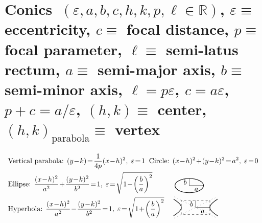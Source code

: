 \section*{Conics\ \normalfont\scriptsize{$(\varepsilon,a,b,c,h,k,p,\ell\in\mathbb{R})$, $\varepsilon\equiv$ eccentricity, $c\equiv$ focal distance, $p \equiv$ focal parameter, $\ell \equiv$ semi-latus rectum, $a\equiv$ semi-major axis, $b \equiv$ semi-minor axis, $\ell = p \varepsilon$, $c=a\varepsilon$}, $p+c =a/\varepsilon $, $(h,k)\equiv$ center, $(h,k)_{\text{parabola}}\equiv$ vertex }
\begin{align*}
&\text{Vertical parabola: }(y\!-\!k)\!=\!\frac{1}{4p}(x\!-\!h)^2,\;\varepsilon\!=\!1 \;\;\text{Circle: }(x\!-\!h)^2\!+\!(y\!-\!k)^2\!=\!a^2,\;\varepsilon\!=\!0 \\
&\text{Ellipse: }\frac{(x\!-\!h)^2}{a^2}\!+\!\frac{(y\!-\!k)^2}{b^2}\!=\!1,\;\varepsilon\!=\!\sqrt{1\!-\!\left(\frac{b}{a}\right)^2}\; \hspace{1cm}
\begin{tikzpicture}[baseline={(0,-1pt)}]
  \draw[thick] (0,0) ellipse (20pt and 10pt);
  \draw (0,0) -- (20pt,0) node[midway,below] {$a$};
  \draw (0,0) -- (0,10pt) node[midway,left] {$b$};
\end{tikzpicture} \\
&\text{Hyperbola: }\frac{(x\!-\!h)^2}{a^2}\!-\!\frac{(y\!-\!k)^2}{b^2}\!=\!1,\;\varepsilon\!=\!\sqrt{1\!+\!\left(\frac{b}{a}\right)^2}\; \hspace{10pt}
\begin{tikzpicture}[baseline={(0,-5pt)}]
  \def\a{20pt} \def\b{10pt}
  \draw[dashed] (-\a,-\b) rectangle (\a,\b);
  \draw[dotted] (-1.5*\a,-1.5*\b) -- (1.5*\a,1.5*\b);
  \draw[dotted] (-1.5*\a,1.5*\b) -- (1.5*\a,-1.5*\b);
  \draw[thick] plot[domain=-1:1,samples=50] ({\a*cosh(\x)},{\b*sinh(\x)});
  \draw[thick] plot[domain=-1:1,samples=50] ({-\a*cosh(\x)},{\b*sinh(\x)});
  \draw (0,0) -- (\a,0) node[midway,below] {$a$};
  \draw (0,0) -- (0,\b) node[midway,left] {$b$};
\end{tikzpicture}
\end{align*}